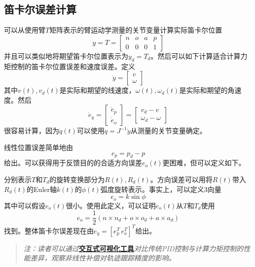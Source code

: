\documentclass[UTF8]{ctexart}
\theoremstyle{definition}
\begin{document}
\subsection{笛卡尔误差计算}

可以从使用臂$T$矩阵表示的臂运动学测量的关节变量计算实际笛卡尔位置
\begin{equation}
    y = T = \begin{bmatrix} n & o & a & p \\ 0 & 0 & 0 & 1 \end{bmatrix}
\end{equation}
并且可以类似地将期望笛卡尔位置表示为$y_d = T_d$。然后可以如下计算适合计算力矩控制的笛卡尔位置误差和速度误差。定义
\begin{equation}
    \dot{y} = \begin{bmatrix} v \\ \omega \end{bmatrix}
\end{equation}
其中$v(t), v_d(t)$是实际和期望的线速度，$\omega(t), \omega_d(t)$是实际和期望的角速度。然后
\begin{equation}
    \dot{e}_y = \begin{bmatrix} \dot{e}_p \\ \dot{e}_o \end{bmatrix} = \begin{bmatrix} v_d - v \\ \omega_d - \omega \end{bmatrix}
\end{equation}
很容易计算，因为$\dot{q}(t)$可以使用$\dot{q} = J^{-1}\dot{y}$从测量的关节变量确定。

线性位置误差简单地由
\begin{equation}
    e_p = p_d - p
\end{equation}
给出。可以获得用于反馈目的的合适方向误差$e_o(t)$更困难，但可以定义如下。

分别表示$T$和$T_d$的旋转变换部分为$R(t), R_d(t)$。方向误差可以用将$R(t)$带入$R_d(t)$的Euler轴$k(t)$的$\phi(t)$弧度旋转表示。事实上，可以定义3向量
\begin{equation}
    e_o = k\sin\phi
\end{equation}
其中可以假设$e_o(t)$很小。使用此定义，可以证明$e_o(t)$从$T$和$T_d$使用
\begin{equation}
    e_o = \frac{1}{2}(n \times n_d + o \times o_d + a \times a_d)
\end{equation}
找到。整体笛卡尔误差现在由$e_y = [e_p^T \, e_o^T]^T$给出。

\begin{quote}
\textit{注：读者可以通过}\href{https://frankjie09.github.io/Robot-Manipulator-Control-CN/figures/Computed_Torque_Control.html}{\textbf{交互式可视化工具}}\textit{对比传统PID控制与计算力矩控制的性能差异，观察非线性补偿对轨迹跟踪精度的影响。}
\end{quote}
\end{document}
